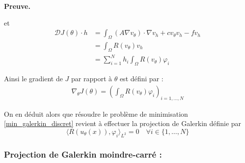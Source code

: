 \documentclass[french]{article}
\newenvironment{preuve}[1][]{\begin{tcolorbox}[
	colback=white, %
	colframe=green!70!black, %
	arc=2mm, %
	boxrule=1pt, %
	breakable, enhanced jigsaw
	]
	\textcolor{green!70!black}{\textbf{Preuve.} \\}

	#1
}{\end{tcolorbox}}
\begin{document}
\begin{itemize}[label=]
\begin{preuve}
			et
			\begin{align*}
				\mathcal{D}J(\theta)\cdot h &= \int_{\Omega} (A\nabla v_\theta) \cdot \nabla v_h + cv_\theta v_h - fv_h \\
				&=\int_\Omega R(v_\theta)v_h \\
				&=\sum_{i=1}^N h_i\int_\Omega R(v_\theta)\varphi_i
			\end{align*}
			
			Ainsi le gradient de $J$ par rapport à $\theta$ est défini par :
			\begin{align*}
				\nabla_\theta J(\theta) = \left(\int_\Omega R(v_\theta)\varphi_i\right)_{i=1,\dots,N}
			\end{align*}
			
			On en déduit alors que résoudre le problème de minimisation \eqref{min_galerkin_discret} revient à effectuer la projection de Galerkin définie par
			\begin{equation*}
				\langle R(u_\theta(x)), \varphi_i\rangle_{L^2} = 0 \quad \forall i \in \{1,\dots,N\}
			\end{equation*}
		\end{preuve}
	\end{itemize}		
	
	\subsubsection{Projection de Galerkin moindre-carré :}
	
\end{document}
